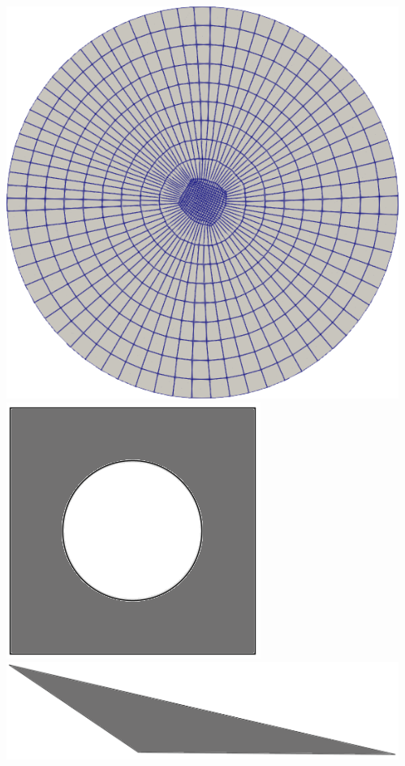 \documentclass[compress,10pt,aspectratio=169]{beamer}
\begin{document}
\begin{frame}
\begin{columns}
\begin{column}{0.55\textwidth}
    \end{column}
    \begin{column}{0.45\textwidth}
        \centering
        \vspace{-0.15cm}
        \includegraphics[scale=0.12]{images/new_cercle.png}
        \hspace{0.6cm}
        \includegraphics[scale=0.28]{images/carreTrou.png}
        \\\vspace{0.2cm}
        \includegraphics[scale=0.18]{images/triangle_etire.png}

\end{column}
\end{columns}
\end{frame}
\end{document}
